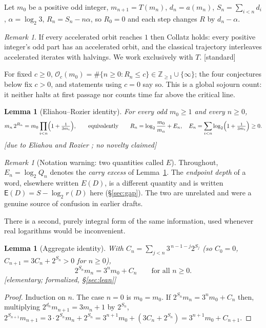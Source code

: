 \documentclass[11pt]{article}
\theoremstyle{plain}
\newtheorem{lemma}[theorem]{Lemma}
\theoremstyle{definition}
\theoremstyle{remark}
\newtheorem{remark}[theorem]{Remark}
\newcommand{\Occ}{\mathcal{O}}
\newcommand{\Edep}{\mathsf{E}}          %
\newcommand{\al}{\alpha}
\newcommand{\status}[1]{\textsf{\footnotesize[#1]}}
\begin{document}
Let $m_0$ be a positive odd integer, $m_{n+1}=T(m_n)$, $d_n=a(m_n)$, $S_n=\sum_{i<n}d_i$,
$\al=\log_2 3$, $R_n=S_n-n\al$, so $R_0=0$ and each step changes $R$ by $d_n-\al$.

\begin{remark}
If every accelerated orbit reaches $1$ then Collatz holds: every positive integer's odd part has an
accelerated orbit, and the classical trajectory interleaves accelerated iterates with halvings. We
work exclusively with $T$. \status{standard}
\end{remark}

For fixed $c\ge0$, $\Occ_c(m_0)=\#\{n\ge0:R_n\le c\}\in\mathbb{Z}_{\ge1}\cup\{\infty\}$; the four
conjectures below fix $c>0$, and statements using $c=0$ say so. This is a
global sojourn count: it neither halts at first passage nor counts time far above the critical line.

\begin{lemma}[Eliahou--Rozier identity]\label{lem:ER}
For every odd $m_0\ge1$ and every $n\ge0$,
\[
m_n\,2^{R_n}=m_0\prod_{i<n}\Bigl(1+\tfrac{1}{3m_i}\Bigr),
\qquad\text{equivalently}\qquad
R_n=\log_2\frac{m_0}{m_n}+E_n,\quad
E_n=\sum_{i<n}\log_2\Bigl(1+\tfrac{1}{3m_i}\Bigr)\ge0 .
\]
\status{due to Eliahou \cite{Eliahou} and Rozier \cite{Rozier}; no novelty claimed}
\end{lemma}

\begin{remark}[Notation warning: two quantities called $E$]\label{rem:twoE}
Throughout, $E_n=\log_2 Q_n$ denotes the \emph{carry excess} of Lemma~\ref{lem:ER}. The
\emph{endpoint depth} of a word, elsewhere written $E(D)$, is a different quantity and is written
$\Edep(D)=S-\log_2 r(D)$ here (\S\ref{sec:gap}). The two are unrelated and were a genuine source of
confusion in earlier drafts.
\end{remark}

There is a second, purely integral form of the same information, used whenever real logarithms
would be inconvenient.

\begin{lemma}[Aggregate identity]\label{lem:aggregate}
With $C_n=\sum_{j<n}3^{\,n-1-j}2^{S_j}$ (so $C_0=0$, $C_{n+1}=3C_n+2^{S_n}>0$ for $n\ge0$),
\[
2^{S_n}m_n=3^n m_0+C_n \qquad\text{for all }n\ge0 .
\]
\status{elementary; formalized, \S\ref{sec:lean}}
\end{lemma}

\begin{proof}
Induction on $n$. The case $n=0$ is $m_0=m_0$. If $2^{S_n}m_n=3^nm_0+C_n$ then, multiplying
$2^{d_n}m_{n+1}=3m_n+1$ by $2^{S_n}$,
$2^{S_{n+1}}m_{n+1}=3\cdot 2^{S_n}m_n+2^{S_n}=3^{n+1}m_0+(3C_n+2^{S_n})=3^{n+1}m_0+C_{n+1}$.
\end{proof}
\end{document}

